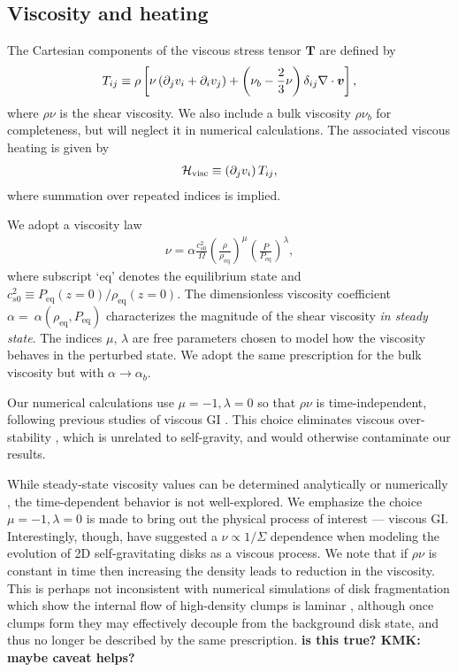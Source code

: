 \subsection{Viscosity and heating}\label{visc_model}
The Cartesian components of the viscous stress tensor $\bm{T}$ are
defined by 
\begin{align}
  T_{ij} \equiv \rho \left[\nu \left(\partial_j v_i + \partial_i v_j\right) +
    \left(\nu_b-\frac{2}{3}\nu\right)\delta_{ij}\nabla\cdot\bm{v}\right], 
\end{align}
where $\rho\nu$ is the shear viscosity. We also include a bulk
viscosity $\rho\nu_b$ for completeness, but will neglect it in
numerical calculations. The associated viscous heating is given by 
\begin{align}
  \mathcal{H}_\mathrm{visc} \equiv \left(\partial_jv_i\right)T_{ij}, 
\end{align}
where summation over repeated indices is implied. 

We adopt a viscosity law  
\begin{align}\label{visc_law}
  \nu = \alpha
  \frac{c_{s0}^2}{\Omega}\left(\frac{\rho}{\rho_\mathrm{eq}}\right)^\mu\left(\frac{P}{P_\mathrm{eq}}\right)^\lambda,             
\end{align}
where subscript `eq' denotes the equilibrium state and  
$c_{s0}^2\equiv P_\mathrm{eq}(z=0)/\rho_\mathrm{eq}(z=0)$. 
The dimensionless viscosity coefficient 
$\alpha=~\alpha(\rho_\mathrm{eq},P_\mathrm{eq})$ characterizes the
magnitude of the shear viscosity \emph{in steady state}. The indices
$\mu,\,\lambda$ are free parameters chosen to model how the viscosity
behaves in the perturbed state.  
We adopt the same prescription for the bulk viscosity but
with $\alpha\to\alpha_b$.   

Our numerical calculations use $\mu=-1,\lambda=0$ so 
that $\rho\nu$ is time-independent, following previous 
studies of viscous GI  
\citep{lynden-bell74,hunter83,willerding92,gammie96}.  
This choice eliminates viscous over-stability
\citep{schmit95,latter06}, which is unrelated to self-gravity, and
would otherwise contaminate our results. %

While steady-state viscosity values can be determined 
analytically or numerically \citep[e.g.][]{martin11,kratter08,rafikov15}, the time-dependent behavior is
not well-explored. We emphasize the choice $\mu=-1,\lambda=0$ is made
to bring out the physical process of interest --- viscous GI. 
Interestingly, though, \cite{laughlin96b} have suggested a $\nu \propto 1/\Sigma$
dependence when modeling the evolution of 2D self-gravitating disks 
as a viscous process. We note that if $\rho\nu$ is constant in time
then increasing the density leads to reduction in the viscosity. 
This is perhaps not inconsistent with numerical simulations of disk
fragmentation which show the internal flow of high-density clumps
is laminar \citep{gammie01}, although once clumps form they may effectively decouple
from the background disk state, and thus no longer be described by the same prescription.   
{\bf is this true? KMK: maybe caveat helps?}

